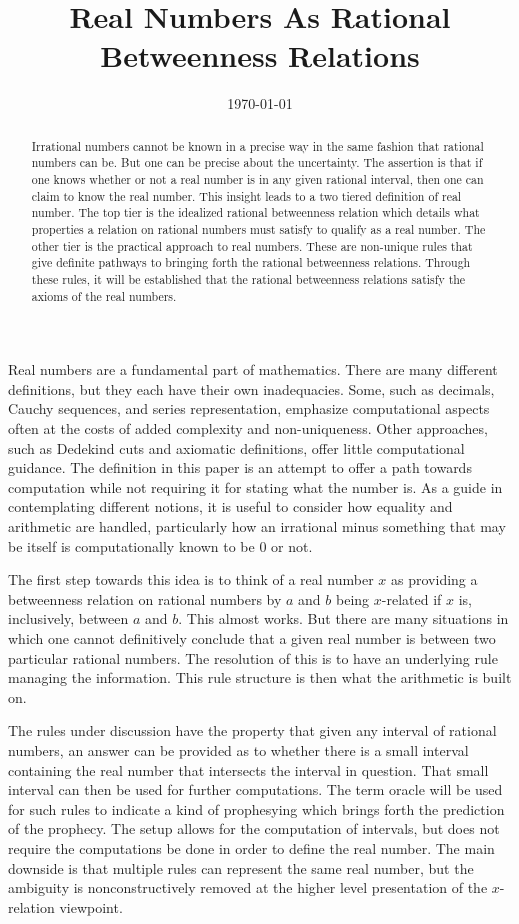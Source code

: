 \documentclass[12pt]{article}
\title{Real Numbers As Rational Betweenness Relations}
\date{\today}
\begin{document}
\maketitle
\begin{abstract}
Irrational numbers cannot be known in a precise way in the same fashion that rational numbers can be. But one can be precise about the uncertainty. The assertion is that if one knows whether or not a real number is in any given rational interval, then one can claim to know the real number. This insight leads to a two tiered definition of real number. The top tier is the idealized rational betweenness relation which details what properties a relation on rational numbers must satisfy to qualify as a real number. The other tier is the practical approach to real numbers. These are non-unique rules that give definite pathways to bringing forth the rational betweenness relations. Through these rules, it will be established that the rational betweenness relations satisfy the axioms of the real numbers. 
\end{abstract}

Real numbers are a fundamental part of mathematics. There are many different definitions, but they each have their own inadequacies. Some, such as decimals, Cauchy sequences, and series representation, emphasize computational aspects often at the costs of added complexity and non-uniqueness. Other approaches, such as Dedekind cuts and axiomatic definitions, offer little computational guidance. The definition in this paper is an attempt to offer a path towards computation while not requiring it for stating what the number is. As a guide in contemplating different notions, it is useful to consider how equality and arithmetic are handled, particularly how an irrational minus something that may be itself is computationally known to be 0 or not. 

The first step towards this idea is to think of a real number $x$ as providing a betweenness relation on rational numbers by $a$ and $b$ being $x$-related if $x$ is, inclusively, between $a$ and $b$. This almost works. But there are many situations in which one cannot definitively conclude that a given real number is between two particular rational numbers. The resolution of this is to have an underlying rule managing the information. This rule structure is then what the arithmetic is built on.

The rules under discussion have the property that given any interval of rational numbers, an answer can be provided as to whether there is a small interval containing the real number that intersects the interval in question. That small interval can then be used for further computations. The term oracle will be used for such rules to indicate a kind of prophesying which brings forth the prediction of the prophecy. The setup allows for the computation of intervals, but does not require the computations be done in order to define the real number. The main downside is that multiple rules can represent the same real number, but the ambiguity is nonconstructively removed at the higher level presentation of the $x$-relation viewpoint.  
\end{document}
